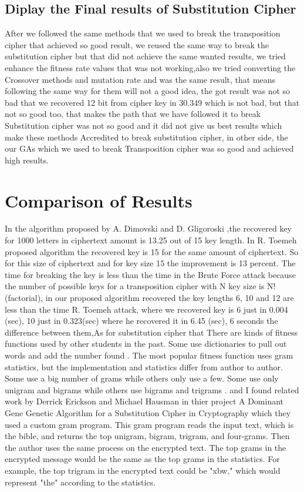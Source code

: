  \subsection{Diplay the Final results of Substitution Cipher}
 
 After we followed the same methods that we used to break the transposition cipher that achieved so good result, we reused the same way to break the substitution cipher but that did not achieve the same wanted results, we tried enhance the fitness rate values that was not working,also we tried converting the Crossover methods and mutation rate and was the same result, that means following the same way for them will not a good idea, the got result was not so bad that we recovered 12 bit from cipher key in 30.349 which is not bad, but that not so good too, that makes the path that we have followed it to break Substitution cipher was not so good and it did not give us best results which make these methods Accredited to break substitution cipher, in other side, the our GAs which we used to break Transposition cipher was so good and achieved high results. 
 \section{Comparison of Results}
 In the algorithm proposed by A. Dimovski and D.
Gligoroski \cite{dimovski2003attacks},the recovered key for 1000 letters in
ciphertext amount is 13.25 out of 15 key length. In R. Toemeh \cite{toemeh2007breaking} proposed algorithm the recovered key is 15 for the same
amount of ciphertext. So for this size of ciphertext and for
key size 15 the improvement is 13 percent. The time for
breaking the key is less than the time in the Brute Force
attack because the number of possible keys for a
transposition cipher with N key size is N! (factorial), in our proposed algorithm recovered the  key lengths 6, 10 and 12 are less than the time R. Toemeh attack, where we recovered key is 6 just in 0.004 (sec),
10 just in 0.323(sec) where he recovered it in 6.45 (sec), 6 seconds the difference between them,As for substitution cipher that There are kinds of fitness functions used by other students in
the past. Some use dictionaries to pull out words and add the
number found \cite{oranchak2008evolutionary}\cite{morelli2003word}. The most popular fitness function uses
gram statistics, but the implementation and statistics differ from
author to author. Some use a big number of grams while
others only use a few. Some use only unigram and bigrams
while others use bigrams and trigrams
\cite{clark1998optimisation}\cite{spillman1993use}.
and I found related work by Derrick Erickson and Michael Hausman in thier project A Dominant Gene Genetic Algorithm for a
Substitution Cipher in Cryptography\cite{ericksondominant} which they used a custom gram program. This gram program reads the
input text, which is the bible, and returns the top unigram,
bigram, trigram, and four-grams. Then the author uses the
same process on the encrypted text. The top grams in the
encrypted message would be the same as the top grams in the
statistics. For example, the top trigram in the encrypted text
could be "xbw," which would represent "the" according to the
statistics.

